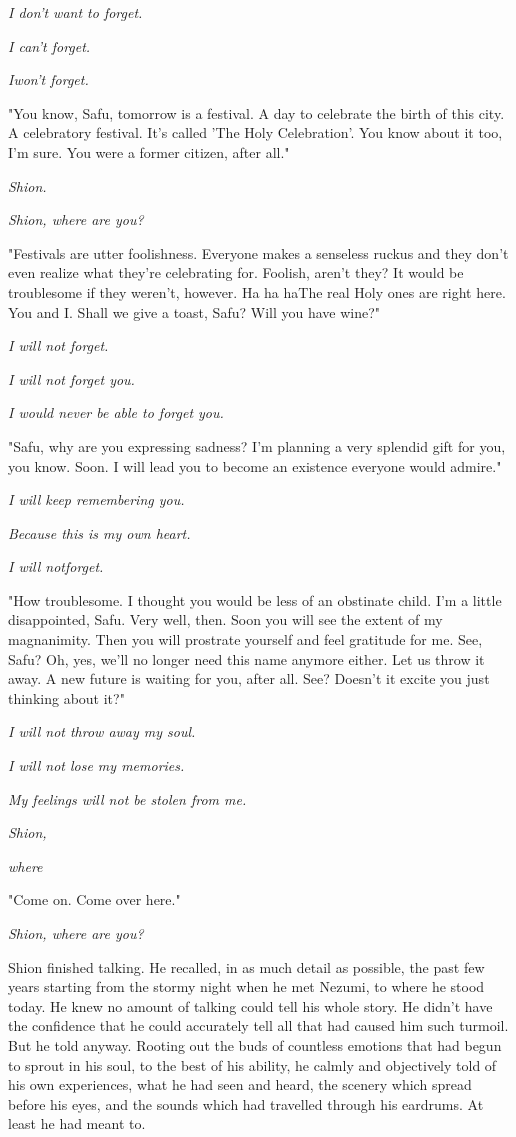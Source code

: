 \emph{I don't want to forget.}

\emph{I can't forget.}

\emph{I\el won't forget.}

"You know, Safu, tomorrow is a festival. A day to celebrate the birth of
this city. A celebratory festival. It's called 'The Holy Celebration'.
You know about it too, I'm sure. You were a former citizen, after all."

\emph{Shion.}

\emph{Shion, where are you?}

"Festivals are utter foolishness. Everyone makes a senseless ruckus and
they don't even realize what they're celebrating for. Foolish, aren't
they? It would be troublesome if they weren't, however. Ha ha ha\el The
real Holy ones are right here. You and I. Shall we give a toast, Safu?
Will you have wine?"

\emph{I will not forget.}

\emph{I will not forget you.}

\emph{I would never be able to forget you.}

"Safu, why are you expressing sadness? I'm planning a very splendid gift
for you, you know. Soon. I will lead you to become an existence everyone
would admire."

\emph{I will keep remembering you.}

\emph{Because this is my own heart.}

\emph{I will not\el forget.}

"How troublesome. I thought you would be less of an obstinate child. I'm
a little disappointed, Safu. Very well, then. Soon you will see the
extent of my magnanimity. Then you will prostrate yourself and feel
gratitude for me. See, Safu? Oh, yes, we'll no longer need this name
anymore either. Let us throw it away. A new future is waiting for you,
after all. See? Doesn't it excite you just thinking about it?"

\emph{I will not throw away my soul.}

\emph{I will not lose my memories.}

\emph{My feelings will not be stolen from me.}

\emph{Shion,}

\emph{where\el }

"Come on. Come over here."

\emph{Shion, where are you?}

\mybreak

Shion finished talking. He recalled, in as much detail as possible, the
past few years starting from the stormy night when he met Nezumi, to
where he stood today. He knew no amount of talking could tell his whole
story. He didn't have the confidence that he could accurately tell all
that had caused him such turmoil. But he told anyway. Rooting out the
buds of countless emotions that had begun to sprout in his soul, to the
best of his ability, he calmly and objectively told of his own
experiences, what he had seen and heard, the scenery which spread before
his eyes, and the sounds which had travelled through his eardrums. At
least he had meant to.

